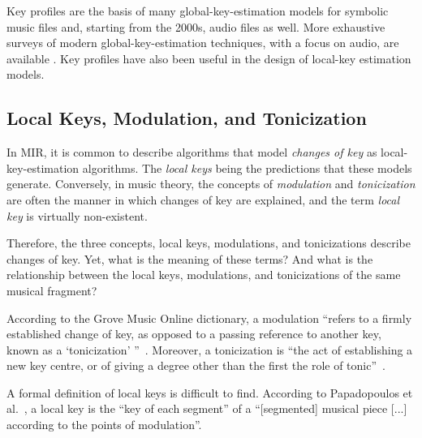 
Key profiles are the basis of many global-key-estimation models for symbolic music files and, starting from the 2000s, audio files as well. More exhaustive surveys of modern global-key-estimation techniques, with a focus on audio, are available \cite{korzeniowski_harmonic_2018, campbell_automatic_2010}. Key profiles have also been useful in the design of local-key estimation models.

\subsection{Local Keys, Modulation, and Tonicization}\label{ssec:terminology}

In MIR, it is common to describe algorithms that model \emph{changes of key} as local-key-estimation algorithms. 
The \emph{local keys} being the predictions that these models generate. Conversely, in music theory, the concepts of \emph{modulation} and \emph{tonicization} are often the manner in which changes of key are explained, and the term \emph{local key} is virtually non-existent.

Therefore, the three concepts, local keys, modulations, and tonicizations describe changes of key. 
Yet, what is the meaning of these terms? And what is the relationship between the local keys, modulations, and tonicizations of the same musical fragment?

According to the Grove Music Online dictionary, a modulation ``refers to a firmly established change of key, as opposed to a passing reference to another key, known as a `tonicization' ''~\cite{saslawgrovemodulation}. Moreover, a tonicization is ``the act of establishing a new key centre, or of giving a degree other than the first the role of tonic''~\cite{drabkintonicization}.

A formal definition of local keys is difficult to find. According to Papadopoulos et al.~\cite{papadopoulos_local_2009}, a local key is the ``key of each segment'' of a ``[segmented] musical piece [...] according to the points of modulation''. 

